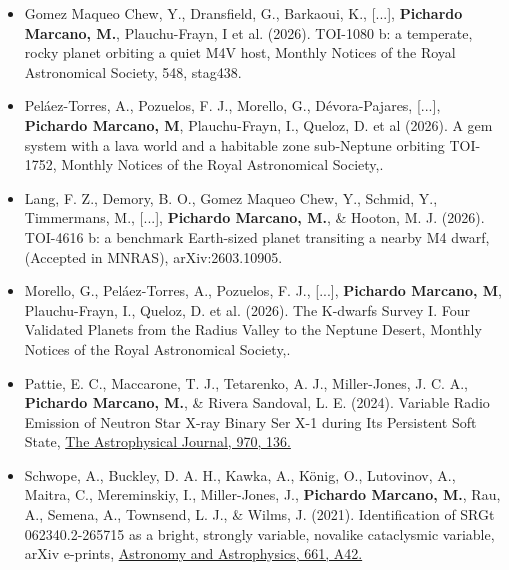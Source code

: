 \documentclass[letterpaper,10pt]{article}
\begin{document}
\begin{itemize}[label=$\blacktriangleright$]
\item Gomez Maqueo Chew, Y., Dransfield, G., Barkaoui, K., [...], \textbf{Pichardo Marcano, M.}, Plauchu-Frayn, I et al. (2026). TOI-1080 b: a temperate, rocky planet orbiting a quiet M4V host, Monthly Notices of the Royal Astronomical Society, 548, stag438.


\item Pel\'aez-Torres, A., Pozuelos, F. J., Morello, G., Dévora-Pajares, [...], \textbf{Pichardo Marcano, M}, Plauchu-Frayn, I., Queloz, D. et al (2026). A gem system with a lava world and a habitable zone sub-Neptune orbiting TOI-1752, Monthly Notices of the Royal Astronomical Society,.



\item Lang, F. Z., Demory, B. O., Gomez Maqueo Chew, Y., Schmid, Y., Timmermans, M., [...], \textbf{Pichardo Marcano, M.}, \& Hooton, M. J. (2026). TOI-4616 b: a benchmark Earth-sized planet transiting a nearby M4 dwarf, (Accepted in MNRAS), arXiv:2603.10905.





\item Morello, G., Pel\'aez-Torres, A., Pozuelos, F. J., [...], \textbf{Pichardo Marcano, M}, Plauchu-Frayn, I., Queloz, D. et al. (2026). The K-dwarfs Survey I. Four Validated Planets from the Radius Valley to the Neptune Desert, Monthly Notices of the Royal Astronomical Society,.






\item Pattie, E. C., Maccarone, T. J., Tetarenko, A. J., Miller-Jones, J. C. A., \textbf{Pichardo Marcano, M.}, \& Rivera Sandoval, L. E. (2024). Variable Radio Emission of Neutron Star X-ray Binary Ser X-1 during Its Persistent Soft State, \href{https://ui.adsabs.harvard.edu/abs/2024ApJ...970..126P/abstract}{The Astrophysical Journal, 970, 136.}





        
        
        \item Schwope, A., Buckley, D. A. H., Kawka, A., K\"onig, O., Lutovinov, A., Maitra, C., Mereminskiy, I., Miller-Jones, J., \textbf{Pichardo Marcano, M.}, Rau, A., Semena, A., Townsend, L. J., \& Wilms, J. (2021). Identification of SRGt 062340.2-265715 as a bright, strongly variable, novalike cataclysmic variable, arXiv e-prints, \href{https://ui.adsabs.harvard.edu/abs/2021arXiv210614538S/abstract}{Astronomy and Astrophysics, 661, A42.}






\end{itemize}
\end{document}
